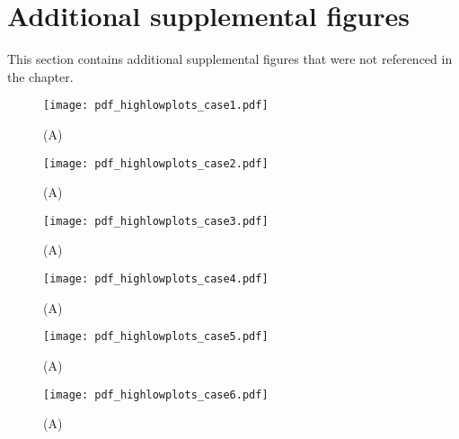 
\FloatBarrier
\clearpage
\section*{Additional supplemental figures}

This section contains additional supplemental figures that were not referenced in the chapter.

\begin{figure}%
	\centering
	\texttt{[image: pdf\_highlowplots\_case1.pdf]}
	\caption{ 
		(A) 
	}
	\label{fig:CRP:XXX}
\end{figure}%
\begin{figure}%
	\centering
	\texttt{[image: pdf\_highlowplots\_case2.pdf]}
	\caption{ 
		(A) 
	}
	\label{fig:CRP:XXX}
\end{figure}%
\begin{figure}%
	\centering
	\texttt{[image: pdf\_highlowplots\_case3.pdf]}
	\caption{ 
		(A) 
	}
	\label{fig:CRP:XXX}
\end{figure}%
\begin{figure}%
	\centering
	\texttt{[image: pdf\_highlowplots\_case4.pdf]}
	\caption{ 
		(A) 
	}
	\label{fig:CRP:XXX}
\end{figure}%
\begin{figure}%
	\centering
	\texttt{[image: pdf\_highlowplots\_case5.pdf]}
	\caption{ 
		(A) 
	}
	\label{fig:CRP:XXX}
\end{figure}%
\begin{figure}%
	\centering
	\texttt{[image: pdf\_highlowplots\_case6.pdf]}
	\caption{ 
		(A) 
	}
	\label{fig:CRP:XXX}
\end{figure}%


